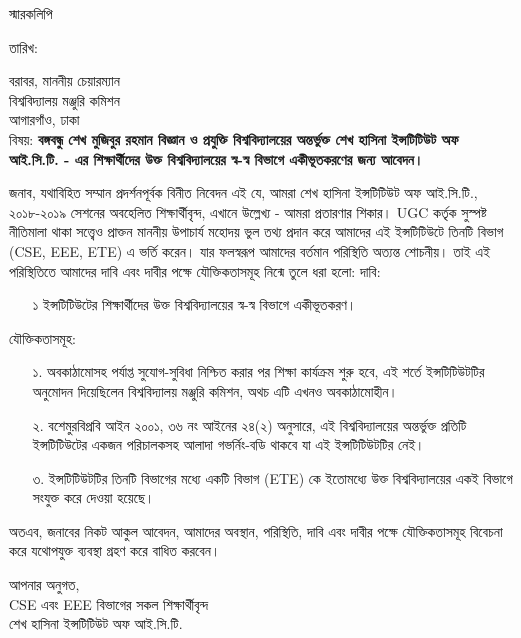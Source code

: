 \documentclass{article}
\begin{document}
\thispagestyle{empty}

\begin{center}
	\fontsize{17}{17}\selectfont স্মারকলিপি
\end{center}

\fontsize{9}{9}\selectfont
তারিখ:  \linebreak

\vspace{1 pt}
বরাবর, \linebreak
মাননীয় চেয়ারম্যান \\
বিশ্ববিদ্যালয় মঞ্জুরি কমিশন \\
আগারগাঁও, ঢাকা \\
বিষয়:  \textbf{বঙ্গবন্ধু শেখ মুজিবুর রহমান বিজ্ঞান ও প্রযুক্তি বিশ্ববিদ্যালয়ের অন্তর্ভুক্ত শেখ হাসিনা ইন্সটিটিউট \linebreak অফ আই.সি.টি. - এর শিক্ষার্থীদের উক্ত বিশ্ববিদ্যালয়ের স্ব-স্ব বিভাগে একীভূতকরণের জন্য আবেদন।} \linebreak

\vspace{2 pt}

জনাব, \linebreak
যথাবিহিত সম্মান প্রদর্শনপূর্বক বিনীত নিবেদন এই যে, আমরা শেখ হাসিনা ইন্সটিটিউট অফ আই.সি.টি., \linebreak ২০১৮-২০১৯ সেশনের অবহেলিত শিক্ষার্থীবৃন্দ, এখানে উল্লেখ্য - আমরা প্রতারণার শিকার। UGC কর্তৃক \linebreak সুস্পষ্ট নীতিমালা থাকা সত্ত্বেও প্রাক্তন মাননীয় উপাচার্য মহোদয় ভুল তথ্য প্রদান করে আমাদের এই \linebreak ইন্সটিটিউটে তিনটি বিভাগ (CSE, EEE, ETE) এ ভর্তি করেন। যার ফলস্বরূপ আমাদের বর্তমান পরিস্থিতি \linebreak অত্যন্ত শোচনীয়। \linebreak
তাই এই পরিস্থিতিতে আমাদের দাবি এবং দাবীর পক্ষে যৌক্তিকতাসমূহ নিন্মে তুলে ধরা হলো: \linebreak
দাবি:
\begin{enumerate}
\item[১] ইন্সটিটিউটের শিক্ষার্থীদের উক্ত বিশ্ববিদ্যালয়ের স্ব-স্ব বিভাগে একীভূতকরণ।
\end{enumerate}

যৌক্তিকতাসমূহ:
\begin{enumerate}
\item[১.] অবকাঠামোসহ পর্যাপ্ত সুযোগ-সুবিধা নিশ্চিত করার পর শিক্ষা কার্যক্রম শুরু হবে, এই শর্তে \linebreak ইন্সটিটিউটটির অনুমোদন দিয়েছিলেন বিশ্ববিদ্যালয় মঞ্জুরি কমিশন, অথচ এটি এখনও অবকাঠামোহীন।
\item[২.] বশেমুরবিপ্রবি আইন ২০০১, ৩৬ নং আইনের ২৪(২) অনুসারে, এই বিশ্ববিদ্যালয়ের অন্তর্ভুক্ত প্রতিটি ইন্সটিটিউটের একজন পরিচালকসহ আলাদা গভর্নিং-বডি থাকবে যা এই ইন্সটিটিউটটির নেই।
\item[৩.] ইন্সটিটিউটটির তিনটি বিভাগের মধ্যে একটি বিভাগ (ETE) কে ইতোমধ্যে উক্ত বিশ্ববিদ্যালয়ের একই বিভাগে সংযুক্ত করে দেওয়া হয়েছে।
\end{enumerate}

অতএব, জনাবের নিকট আকুল আবেদন, আমাদের অবস্থান, পরিস্থিতি, দাবি এবং দাবীর পক্ষে যৌক্তিকতাসমূহ বিবেচনা করে যথোপযুক্ত ব্যবস্থা গ্রহণ করে বাধিত করবেন। \linebreak

\vspace{1 pt}

\fontsize{11}{11}\selectfont
আপনার অনুগত, \\
CSE এবং EEE বিভাগের সকল শিক্ষার্থীবৃন্দ \\
শেখ হাসিনা ইন্সটিটিউট অফ আই.সি.টি.
\end{document}
